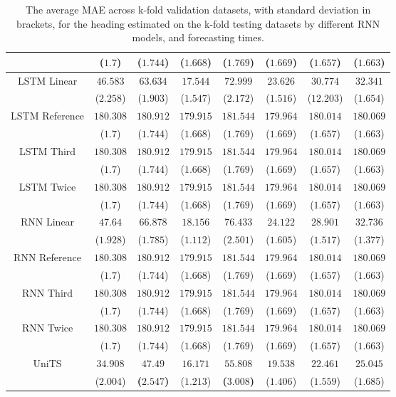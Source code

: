 \begin{table}[!ht]
{\begin{tabular}{|c|c|c|c|c|c|c|c|}
			 & ($1.7$) & ($1.744$) & ($1.668$) & ($1.769$) & ($1.669$) & ($1.657$) & ($1.663$) \\ \hline
			\multirow{2}{*}{LSTM Linear} & $46.583$ & $63.634$ & $17.544$ & $72.999$ & $23.626$ & $30.774$ & $32.341$ \\
			 & ($2.258$) & ($1.903$) & ($1.547$) & ($2.172$) & ($1.516$) & ($12.203$) & ($1.654$) \\ \hline
			\multirow{2}{*}{LSTM Reference} & $180.308$ & $180.912$ & $179.915$ & $181.544$ & $179.964$ & $180.014$ & $180.069$ \\
			 & ($1.7$) & ($1.744$) & ($1.668$) & ($1.769$) & ($1.669$) & ($1.657$) & ($1.663$) \\ \hline
			\multirow{2}{*}{LSTM Third} & $180.308$ & $180.912$ & $179.915$ & $181.544$ & $179.964$ & $180.014$ & $180.069$ \\
			 & ($1.7$) & ($1.744$) & ($1.668$) & ($1.769$) & ($1.669$) & ($1.657$) & ($1.663$) \\ \hline
			\multirow{2}{*}{LSTM Twice} & $180.308$ & $180.912$ & $179.915$ & $181.544$ & $179.964$ & $180.014$ & $180.069$ \\
			 & ($1.7$) & ($1.744$) & ($1.668$) & ($1.769$) & ($1.669$) & ($1.657$) & ($1.663$) \\ \hline
			\multirow{2}{*}{RNN Linear} & $47.64$ & $66.878$ & $18.156$ & $76.433$ & $24.122$ & $28.901$ & $32.736$ \\
			 & ($1.928$) & ($1.785$) & ($1.112$) & ($2.501$) & ($1.605$) & ($1.517$) & ($1.377$) \\ \hline
			\multirow{2}{*}{RNN Reference} & $180.308$ & $180.912$ & $179.915$ & $181.544$ & $179.964$ & $180.014$ & $180.069$ \\
			 & ($1.7$) & ($1.744$) & ($1.668$) & ($1.769$) & ($1.669$) & ($1.657$) & ($1.663$) \\ \hline
			\multirow{2}{*}{RNN Third} & $180.308$ & $180.912$ & $179.915$ & $181.544$ & $179.964$ & $180.014$ & $180.069$ \\
			 & ($1.7$) & ($1.744$) & ($1.668$) & ($1.769$) & ($1.669$) & ($1.657$) & ($1.663$) \\ \hline
			\multirow{2}{*}{RNN Twice} & $180.308$ & $180.912$ & $179.915$ & $181.544$ & $179.964$ & $180.014$ & $180.069$ \\
			 & ($1.7$) & ($1.744$) & ($1.668$) & ($1.769$) & ($1.669$) & ($1.657$) & ($1.663$) \\ \hline
			\multirow{2}{*}{UniTS} & $34.908$ & $\mathbf{47.49}$ & $16.171$ & $\mathbf{55.808}$ & $19.538$ & $22.461$ & $25.045$ \\
			 & ($2.004$) & \textbf{(}$\mathbf{2.547}$\textbf{)} & ($1.213$) & \textbf{(}$\mathbf{3.008}$\textbf{)} & ($1.406$) & ($1.559$) & ($1.685$) \\ \hline
		\end{tabular}
	}
	\caption{The average MAE across k-fold validation datasets, with standard deviation in brackets, for the heading estimated on the k-fold testing datasets by different RNN models, and forecasting times.}
	\label{tab:all_direction_MAE}
\end{table}

